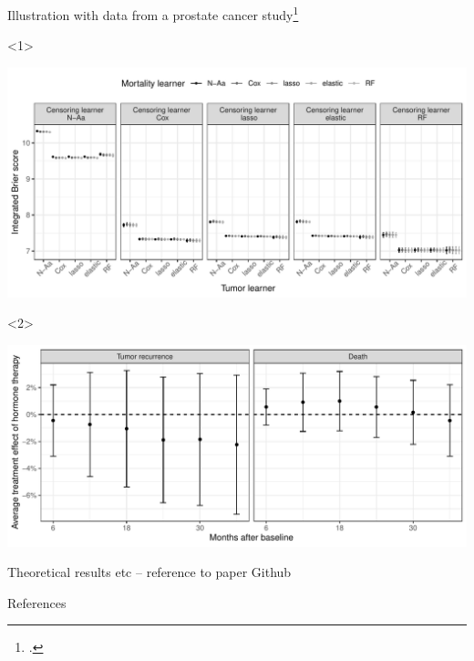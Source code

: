 \documentclass[smaller]{beamer}\usepackage{listings}
\newcommand{\1}{\mathds{1}}
\begin{document}
\begin{frame}[label={sec:org419040c}]{Illustration with data from a prostate cancer study\footnote{\cite{kattan2000pretreatment}.}}
\begin{onlyenv}<1>
\begin{center}
\includegraphics[width=1\textwidth]{./real-data-state-learner.pdf}
\end{center}
\end{onlyenv}

\begin{onlyenv}<2>
\begin{center}
\includegraphics[width=1\textwidth]{./real-data-target.pdf}
\end{center}
\end{onlyenv}
\end{frame}

\begin{frame}[label={sec:orgbcd1621}]{Theoretical results etc -- reference to paper Github}
\end{frame}

\begin{frame}[label={sec:orgc4aaa09}]{References}
\footnotesize 
\end{frame}
\end{document}
